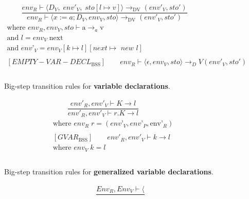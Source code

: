 \begin{figure}[htbp]
	\centering
	\begin{gather*}
		[VAR-DECL_\text{BSS}]
		\qquad 
		\dfrac
		{env_R \vdash \langle D_V,\; env'_V, \; sto[l \mapsto v] \rangle \rightarrow_\text{DV} (env'_V, sto')}
		{env_R \vdash \langle x:=a; D_V, env_V, sto \rangle \rightarrow_\text{DV} (env'_V, sto')} \\
		\text{where } \textit{env}_R, \textit{env}_V, \textit{sto} \vdash \text{a} \rightarrow_a \text{v} \\
		\text{and } \textit{l} = \textit{env}_V \; \text{next} \\
		\text{and } \textit{env'}_V = \textit{env}_V[k \mapsto l][next \mapsto \textit{ new } l]
		\\
		\\
		[EMPTY-VAR-DECL_\text{BSS}]
		\qquad env_R \vdash \langle \epsilon, env_V, sto \rangle \rightarrow_DV (env'_V, sto')
		\\
		\\
	\end{gather*}
	\caption{Big-step transition rules for \textbf{variable declarations}.}
	\label{fig:BssStm}
\end{figure}

\begin{figure}[htbp]
	\centering
	\begin{gather*}
		[GVAR_\text{BSS}]
		\qquad 
		\dfrac
		{env'_R, env'_V \vdash K \rightarrow \textit{l}}
		{env'_R, env'_V \vdash r.K \rightarrow \textit{l}} \\
		\text{where } \textit{env}_R \; r = (\textit{env'}_V, \textit{env'}_P, \text{env'}_R)
		\\
		\\
		[GVAR_\text{BSS}]
		\qquad env'_R, env'_V \vdash k \rightarrow l \\
		\text{where } \textit{env}_V \; k = l
		\\
		\\
	\end{gather*}
	\caption{Big-step transition rules for \textbf{generalized variable declarations}.}
	\label{fig:BssStm}
\end{figure}

\begin{figure}[htbp]
	\centering
	\begin{gather*}
		[MEMBERACCESS_\text{BSS}]
		\qquad
		\dfrac{Env_R, Env_V \vdash \langle  }{}	
	\end{gather*}
	\caption{}
	\label{fig:BssStm}
\end{figure}

